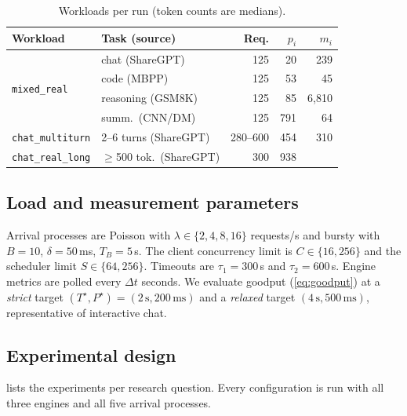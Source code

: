 \begin{table}[t]
  \caption{Workloads per run (token counts are medians).}
  \label{tab:workloads}
  \footnotesize
  \setlength{\tabcolsep}{4pt}
  \begin{tabular}{@{}llrrr@{}}
    \toprule
    Workload & Task (source) & Req. & $p_i$ & $m_i$ \\
    \midrule
    \multirow{4}{*}{\texttt{mixed\_real}}
      & chat (ShareGPT) & 125 & 20 & 239 \\
      & code (MBPP) & 125 & 53 & 45 \\
      & reasoning (GSM8K) & 125 & 85 & 6{,}810 \\
      & summ.\ (CNN/DM) & 125 & 791 & 64 \\
    \texttt{chat\_multiturn} & 2--6 turns (ShareGPT) & 280--600 & 454 & 310 \\
    \texttt{chat\_real\_long} & $\geq$500 tok.\ (ShareGPT) & 300 & 938 & \verify{} \\
    \bottomrule
  \end{tabular}
\end{table}

\subsection{Load and measurement parameters}
\label{sec:params}

Arrival processes are Poisson with $\lambda \in \{2, 4, 8, 16\}$ requests/s and bursty with
$B = 10$, $\delta = 50$\,ms, $T_B = 5$\,s. The client concurrency limit is $C \in \{16, 256\}$
and the scheduler limit $S \in \{64, 256\}$. Timeouts are $\tau_1 = 300$\,s and $\tau_2 = 600$\,s.
Engine metrics are polled every $\Delta t$ \verify{} seconds. We evaluate goodput (\cref{eq:goodput})
at a \emph{strict} target $(T^\star, P^\star) = (2\,\mathrm{s}, 200\,\mathrm{ms})$ and a
\emph{relaxed} target $(4\,\mathrm{s}, 500\,\mathrm{ms})$, representative of interactive chat.

\subsection{Experimental design}
\label{sec:design}

 lists the experiments per research question. Every configuration is run with
all three engines and all five arrival processes.

